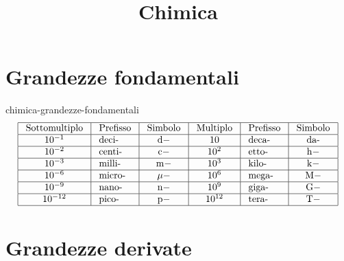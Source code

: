 \documentclass[preview]{standalone}
\begin{document}
\title{Chimica}
\genpage

\section{Grandezze fondamentali}

\begin{snippet}{chimica-grandezze-fondamentali}
    \phantom{}$$
    \begin{array}{|c|l|c|c|l|c|}
    \hline \text { Sottomultiplo } & \text { Prefisso } & \text { Simbolo } & \text { Multiplo } & \text { Prefisso } & \text { Simbolo } \\
    \hline 10^{-1} & \text { deci- } & \mathrm{d}- & 10 & \text { deca- } & \text { da- } \\
    \hline 10^{-2} & \text { centi- } & \mathrm{c}- & 10^2 & \text { etto- } & \mathrm{h}- \\
    \hline 10^{-3} & \text { milli- } & \mathrm{m}- & 10^3 & \text { kilo- } & \mathrm{k}- \\
    \hline 10^{-6} & \text { micro- } & \mu- & 10^6 & \text { mega- } & \mathrm{M}- \\
    \hline 10^{-9} & \text { nano- } & \mathrm{n}- & 10^9 & \text { giga- } & \mathrm{G}- \\
    \hline 10^{-12} & \text { pico- } & \mathrm{p}- & 10^{12} & \text { tera- } & \mathrm{T}- \\
    \hline
    \end{array}
    $$
\end{snippet}

\section{Grandezze derivate}
\end{document}
